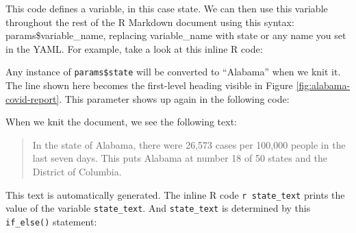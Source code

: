 \documentclass[
]{book}
\newenvironment{Shaded}{\begin{snugshade}}{\end{snugshade}}
\newcommand{\FunctionTok}[1]{\textcolor[rgb]{0.13,0.29,0.53}{\textbf{#1}}}
\newcommand{\InformationTok}[1]{\textcolor[rgb]{0.56,0.35,0.01}{\textbf{\textit{#1}}}}
\newcommand{\NormalTok}[1]{#1}
\newcommand{\OtherTok}[1]{\textcolor[rgb]{0.56,0.35,0.01}{#1}}
\newcommand{\SpecialCharTok}[1]{\textcolor[rgb]{0.81,0.36,0.00}{\textbf{#1}}}
\newcommand{\StringTok}[1]{\textcolor[rgb]{0.31,0.60,0.02}{#1}}
\begin{document}
This code defines a variable, in this case state. We can then use this variable throughout the rest of the R Markdown document using this syntax: params\$variable\_name, replacing variable\_name with state or any name you set in the YAML. For example, take a look at this inline R code:

\begin{Shaded}
\end{Shaded}

Any instance of \texttt{params\$state} will be converted to ``Alabama'' when we knit it. The line shown here becomes the first-level heading visible in Figure \ref{fig:alabama-covid-report}. This parameter shows up again in the following code:

\begin{Shaded}
\end{Shaded}

When we knit the document, we see the following text:

\begin{quote}
In the state of Alabama, there were 26,573 cases per 100,000 people in the last seven days. This puts Alabama at number 18 of 50 states and the District of Columbia.
\end{quote}

This text is automatically generated. The inline R code \texttt{\textasciigrave{}r\ state\_text\textasciigrave{}} prints the value of the variable \texttt{state\_text}. And \texttt{state\_text} is determined by this \texttt{if\_else()} statement:

\begin{Shaded}
\end{Shaded}
\end{document}
